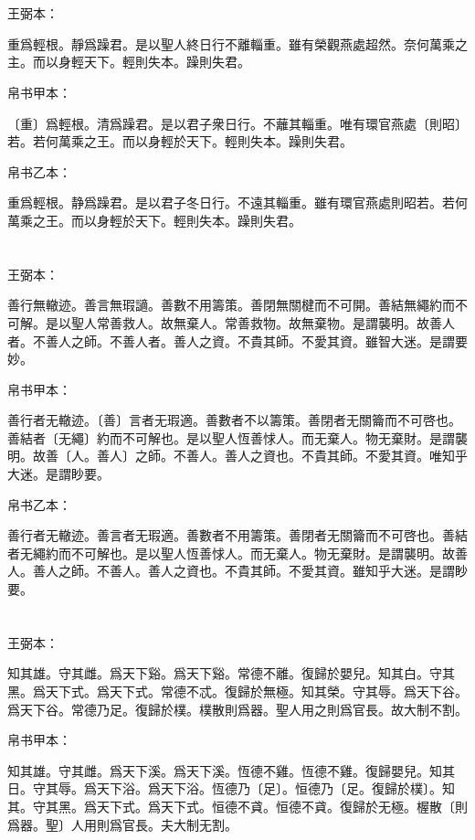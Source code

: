 \documentclass[a5paper]{ctexbook}
\begin{document}
    \chapter{}
    王弼本：

    重爲輕根。靜爲躁君。是以聖人終日行不離輜重。雖有榮觀燕處超然。奈何萬乘之主。而以身輕天下。輕則失本。躁則失君。

    
    帛书甲本：

    〔重〕爲輕根。清爲躁君。是以君子衆日行。不蘺其輜重。唯有環官燕處〔則昭〕若。若何萬乘之王。而以身輕於天下。輕則失本。躁則失君。

    帛书乙本：

    重爲輕根。静爲躁君。是以君子冬日行。不遠其輜重。雖有環官燕處則昭若。若何萬乘之王。而以身輕於天下。輕則失本。躁則失君。

    \chapter{}
    王弼本：

    善行無轍迹。善言無瑕讁。善數不用籌策。善閉無關楗而不可開。善結無繩約而不可解。是以聖人常善救人。故無棄人。常善救物。故無棄物。是謂襲明。故善人者。不善人之師。不善人者。善人之資。不貴其師。不愛其資。雖智大迷。是謂要妙。

    
    帛书甲本：

    善行者无轍迹。〔善〕言者无瑕適。善數者不以籌策。善閉者无關籥而不可啓也。善結者〔无繩〕約而不可解也。是以聖人恆善㤹人。而无棄人。物无棄財。是謂襲明。故善〔人。善人〕之師。不善人。善人之資也。不貴其師。不愛其資。唯知乎大迷。是謂眇要。

    帛书乙本：

    善行者无轍迹。善言者无瑕適。善數者不用籌策。善閉者无關籥而不可啓也。善結者无繩約而不可解也。是以聖人恆善㤹人。而无棄人。物无棄財。是謂襲明。故善人。善人之師。不善人。善人之資也。不貴其師。不愛其資。雖知乎大迷。是謂眇要。

    \chapter{}
    王弼本：

    知其雄。守其雌。爲天下谿。爲天下谿。常德不離。復歸於嬰兒。知其白。守其黑。爲天下式。爲天下式。常德不忒。復歸於無極。知其榮。守其辱。爲天下谷。爲天下谷。常德乃足。復歸於樸。樸散則爲器。聖人用之則爲官長。故大制不割。

    
    帛书甲本：

    知其雄。守其雌。爲天下溪。爲天下溪。恆德不雞。恆德不雞。復歸嬰兒。知其日。守其辱。爲天下浴。爲天下浴。恆德乃〔足〕。恒德乃〔足。復歸於樸〕。知其。守其黑。爲天下式。爲天下式。恒德不貣。恒德不貣。復歸於无極。楃散〔則爲器。聖〕人用則爲官長。夫大制无割。
\end{document}
